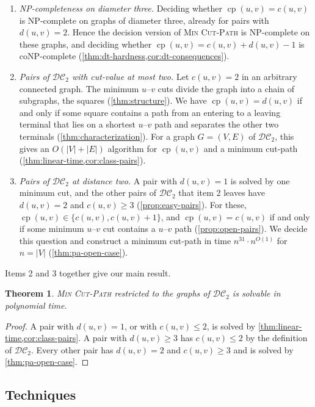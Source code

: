 \documentclass[pdflatex,sn-mathphys-num]{sn-jnl}%
\theoremstyle{thmstyleone}%
\newtheorem{theorem}{Theorem}%
\theoremstyle{thmstyletwo}%
\theoremstyle{thmstylethree}%
\newcommand{\cp}{\operatorname{cp}}%
\newcommand{\DC}{\mathcal{DC}_2}%
\newcommand{\MinCutPath}{\textsc{Min Cut-Path}}%
\begin{document}
\begin{enumerate}
\item \emph{NP-completeness on diameter three.}
Deciding whether $\cp(u, v) = c(u, v)$ is NP-complete on graphs of diameter three, already for pairs with $d(u, v) = 2$.
Hence the decision version of \MinCutPath{} is NP-complete on these graphs, and deciding whether $\cp(u, v) = c(u, v) + d(u, v) - 1$ is coNP-complete (\cref{thm:dt-hardness,cor:dt-consequences}).

\item \emph{Pairs of $\DC$ with cut-value at most two.}
Let $c(u, v) = 2$ in an arbitrary connected graph.
The minimum $u$--$v$ cuts divide the graph into a chain of subgraphs, the squares (\cref{thm:structure}).
We have $\cp(u, v) = d(u, v)$ if and only if some square contains a path from an entering to a leaving terminal that lies on a shortest $u$--$v$ path and separates the other two terminals (\cref{thm:characterization}).
For a graph $G = (V, E)$ of $\DC$, this gives an $O(|V| + |E|)$ algorithm for $\cp(u, v)$ and a minimum cut-path (\cref{thm:linear-time,cor:class-pairs}).

\item \emph{Pairs of $\DC$ at distance two.}
A pair with $d(u, v) = 1$ is solved by one minimum cut, and the other pairs of $\DC$ that item 2 leaves have $d(u, v) = 2$ and $c(u, v) \geq 3$ (\cref{prop:easy-pairs}).
For these, $\cp(u, v) \in \{c(u, v), c(u, v) + 1\}$, and $\cp(u, v) = c(u, v)$ if and only if some minimum $u$--$v$ cut contains a $u$--$v$ path (\cref{prop:open-pairs}).
We decide this question and construct a minimum cut-path in time $n^{31} \cdot n^{O(1)}$ for $n = |V|$ (\cref{thm:pa-open-case}).
\end{enumerate}

Items 2 and 3 together give our main result.

\begin{theorem}\label{thm:main}
\MinCutPath{} restricted to the graphs of $\DC$ is solvable in polynomial time.
\end{theorem}

\begin{proof}
A pair with $d(u, v) = 1$, or with $c(u, v) \leq 2$, is solved by \cref{thm:linear-time,cor:class-pairs}.
A pair with $d(u, v) \geq 3$ has $c(u, v) \leq 2$ by the definition of $\DC$.
Every other pair has $d(u, v) = 2$ and $c(u, v) \geq 3$ and is solved by \cref{thm:pa-open-case}.
\end{proof}

\subsection{Techniques}\label{sec:techniques}
\end{document}
